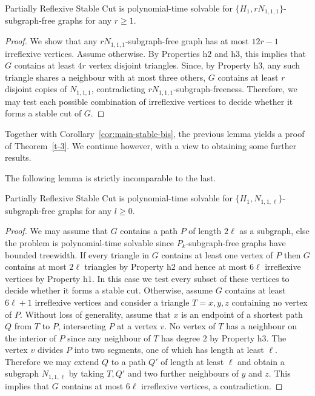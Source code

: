 \documentclass[a4paper,UKenglish,cleveref, autoref,thm-restate]{lipics-v2021}
\begin{document}
\begin{lemma}
{\sc Partially Reflexive Stable Cut} is polynomial-time solvable for $\{H_1, r N_{1,1,1}\}$-subgraph-free graphs for any $r \geq 1$.
\end{lemma}

\begin{proof}
 We show that any $rN_{1,1,1}$-subgraph-free graph has at most $12r-1$ irreflexive vertices. Assume otherwise. By Properties h$2$ and h$3$, this implies that $G$ contains at least $4r$ vertex disjoint triangles. Since, by Property h$3$, any such triangle shares a neighbour with at most three others, $G$ contains at least $r$ disjoint copies of $N_{1,1,1}$, contradicting $rN_{1,1,1}$-subgraph-freeness. Therefore, we may test each possible combination of irreflexive vertices to decide whether it forms a stable cut of $G$.%
\end{proof}
Together with Corollary~\ref{cor:main-stable-bis}, the previous lemma yields a proof of Theorem~\ref{t-3}. We continue however, with a view to obtaining some further results.

The following lemma is strictly incomparable to the last.
\begin{lemma}
{\sc Partially Reflexive Stable Cut} is polynomial-time solvable for $\{H_1, N_{1,1,\ell}\}$-subgraph-free graphs for any $l \geq 0$.
\end{lemma}

\begin{proof}
We may assume that $G$ contains a path $P$ of length $2\ell$ as a subgraph, else the problem is polynomial-time solvable since $P_k$-subgraph-free graphs have bounded treewidth. If every triangle in $G$ contains at least one vertex of $P$ then $G$ contains at most $2\ell$ triangles by Property h$2$ and hence at most $6\ell$ irreflexive vertices by Property h$1$. In this case we test every subset of these vertices to decide whether it forms a stable cut. Otherwise, assume $G$ contains at least $6\ell+1$ irreflexive vertices and consider a triangle $T={x,y,z}$ containing no vertex of $P$. Without loss of generality, assume that $x$ is an endpoint of a shortest path $Q$ from $T$ to $P$, intersecting $P$ at a vertex $v$. No vertex of $T$ has a neighbour on the interior of $P$ since any neighbour of $T$ has degree $2$ by Property h$3$. The vertex $v$ divides $P$ into two segments, one of which has length at least $\ell$. Therefore we may extend $Q$ to a path $Q'$ of length at least $\ell$ and obtain a subgraph $N_{1,1,\ell}$ by taking $T, Q'$ and two further neighbours of $y$ and $z$. This implies that $G$ contains at most $6\ell$ irreflexive vertices, a contradiction.%
\end{proof}
\end{document}

